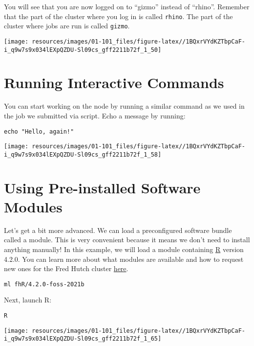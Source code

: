 \documentclass[
]{book}
\begin{document}
You will see that you are now logged on to ``gizmo'' instead of ``rhino''. Remember that the part of the cluster where you log in is called \texttt{rhino}. The part of the cluster where jobs are run is called \texttt{gizmo}.

\texttt{[image: resources/images/01-101\_files/figure-latex//1BQxrVYdKZTbpCaF-i\_q9w7s9x034lEXpQZDU-Sl09cs\_gff2211b72f\_1\_50]}

\hypertarget{running-interactive-commands}{%
\section{Running Interactive Commands}\label{running-interactive-commands}}

You can start working on the node by running a similar command as we used in the job we submitted via script. Echo a message by running:

\begin{verbatim}
echo "Hello, again!"
\end{verbatim}

\texttt{[image: resources/images/01-101\_files/figure-latex//1BQxrVYdKZTbpCaF-i\_q9w7s9x034lEXpQZDU-Sl09cs\_gff2211b72f\_1\_58]}

\hypertarget{using-pre-installed-software-modules}{%
\section{Using Pre-installed Software Modules}\label{using-pre-installed-software-modules}}

Let's get a bit more advanced. We can load a preconfigured software bundle called a module. This is very convenient because it means we don't need to install anything manually! In this example, we will load a module containing \href{https://www.r-project.org/}{R} version 4.2.0. You can learn more about what modules are available and how to request new ones for the Fred Hutch cluster \href{https://sciwiki.fredhutch.org/scicomputing/compute_scientificSoftware/}{here}.

\begin{verbatim}
ml fhR/4.2.0-foss-2021b
\end{verbatim}

Next, launch R:

\begin{verbatim}
R
\end{verbatim}

\texttt{[image: resources/images/01-101\_files/figure-latex//1BQxrVYdKZTbpCaF-i\_q9w7s9x034lEXpQZDU-Sl09cs\_gff2211b72f\_1\_65]}
\end{document}
